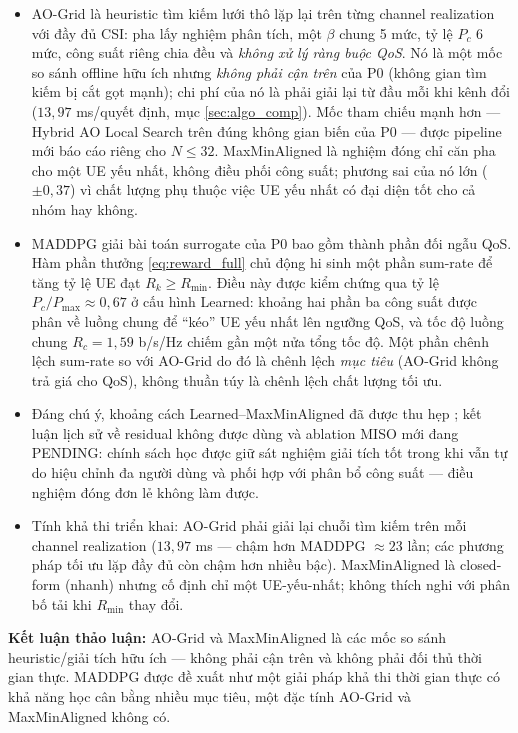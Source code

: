 \begin{itemize}[leftmargin=*]
\item AO-Grid là heuristic tìm kiếm lưới thô lặp lại trên từng channel
realization với đầy đủ CSI: pha lấy nghiệm phân tích, một $\beta$
chung 5 mức, tỷ lệ $P_c$ 6 mức, công suất riêng chia đều và
\emph{không xử lý ràng buộc QoS}. Nó là một mốc so sánh offline hữu
ích nhưng \emph{không phải cận trên} của P0 (không gian tìm kiếm bị
cắt gọt mạnh); chi phí của nó là phải giải lại từ đầu mỗi khi kênh
đổi ($13{,}97$ ms/quyết định, mục \ref{sec:algo_comp}). Mốc tham chiếu
mạnh hơn --- Hybrid AO Local Search trên đúng không gian biến của P0
--- được pipeline mới báo cáo riêng cho $N \leq 32$. MaxMinAligned là
nghiệm đóng chỉ căn pha cho một UE yếu nhất, không điều phối công
suất; phương sai của nó lớn ($\pm 0{,}37$) vì chất lượng phụ thuộc
việc UE yếu nhất có đại diện tốt cho cả nhóm hay không.
\item MADDPG giải bài toán surrogate của P0 bao gồm thành phần đối
ngẫu QoS. Hàm phần thưởng \eqref{eq:reward_full} chủ động hi sinh một
phần sum-rate để tăng tỷ lệ UE đạt $R_k \geq R_{\min}$. Điều này được
kiểm chứng qua tỷ lệ $P_c/P_{\max} \approx 0{,}67$ ở cấu hình Learned:
khoảng hai phần ba công suất được phân về luồng chung để ``kéo'' UE
yếu nhất lên ngưỡng QoS, và tốc độ luồng chung $R_c = 1{,}59$ b/s/Hz
chiếm gần một nửa tổng tốc độ. Một phần chênh lệch sum-rate so với
AO-Grid do đó là chênh lệch \emph{mục tiêu} (AO-Grid không trả giá
cho QoS), không thuần túy là chênh lệch chất lượng tối ưu.
\item Đáng chú ý, khoảng cách Learned--MaxMinAligned đã được thu hẹp
; kết luận lịch sử về residual không được dùng và ablation MISO mới đang PENDING:
chính sách học được giữ sát nghiệm giải tích tốt trong khi vẫn tự do
hiệu chỉnh đa người dùng và phối hợp với phân bổ công suất --- điều
nghiệm đóng đơn lẻ không làm được.
\item Tính khả thi triển khai: AO-Grid phải giải lại chuỗi tìm kiếm
trên mỗi channel realization ($13{,}97$ ms --- chậm hơn MADDPG
$\approx 23$ lần; các phương pháp tối
ưu lặp đầy đủ còn chậm hơn nhiều bậc). MaxMinAligned là closed-form
(nhanh) nhưng cố định chỉ một UE-yếu-nhất; không thích nghi với phân
bố tải khi $R_{\min}$ thay đổi.
\end{itemize}
\textbf{Kết luận thảo luận:} AO-Grid và MaxMinAligned là các mốc so
sánh heuristic/giải tích hữu ích --- không phải cận trên và không phải
đối thủ thời gian thực. MADDPG được đề xuất như một giải pháp khả thi
thời gian thực có khả năng học cân bằng nhiều mục tiêu, một đặc tính
AO-Grid và MaxMinAligned không có.

